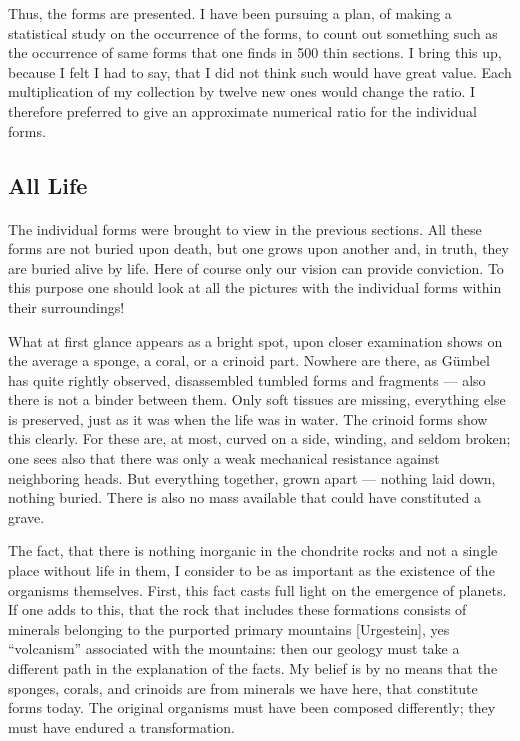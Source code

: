 \documentclass[a4paper, 12pt, oneside]{article}
\begin{document}
Thus, the forms are presented. I have been pursuing a plan, of making a statistical study on the occurrence of the forms, to count out something such as the occurrence of same forms that one finds in 500 thin sections. I bring this up, because I felt I had to say, that I did not think such would have great value. Each multiplication of my collection by twelve new ones would change the ratio. I therefore preferred to give an approximate numerical ratio for the individual forms.
\clearpage
\subsection{All Life}
\paragraph*{}
The individual forms were brought to view in the previous sections. All these forms are not buried upon death, but one grows upon another and, in truth, they are buried alive by life. Here of course only our vision can provide conviction. To this purpose one should look at all the pictures with the individual forms within their surroundings!

What at first glance appears as a bright spot, upon closer examination shows on the average a sponge, a coral, or a crinoid part. Nowhere are there, as Gümbel has quite rightly observed, disassembled tumbled forms and fragments --- also there is not a binder between them. Only soft tissues are missing, everything else is preserved, just as it was when the life was in water. The crinoid forms show this clearly. For these are, at most, curved on a side, winding, and seldom broken; one sees also that there was only a weak mechanical resistance against neighboring heads. But everything together, grown apart --- nothing laid down, nothing buried. There is also no mass available that could have constituted a grave.

The fact, that there is nothing inorganic in the chondrite rocks and not a single place without life in them, I consider to be as important as the existence of the organisms themselves. First, this fact casts full light on the emergence of planets. If one adds to this, that the rock that includes these formations consists of minerals belonging to the purported primary mountains [Urgestein], yes ``volcanism'' associated with the mountains: then our geology must take a different path in the explanation of the facts. My belief is by no means that the sponges, corals, and crinoids are from minerals we have here, that constitute forms today. The original organisms must have been composed differently; they must have endured a transformation.
\end{document}
